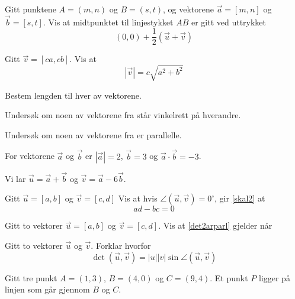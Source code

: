 



	
\opgt
{}
Gitt punktene $ A=(m, n) $ og $ B=(s, t) $, og vektorene $ \vec{a}=[m, n] $ og $ \vec{b}=[s, t] $. Vis at midtpunktet til linjestykket $ AB $ er gitt ved uttrykket
\[ (0, 0) + \frac{1}{2}(\vec{u}+\vec{v}) \]

Gitt $ \vec{v}=[ca, cb] $. Vis at 
\[ |\vec{v}|=c\sqrt{a^2+b^2} \]

 \vs
{}

Bestem lengden til hver av vektorene.

Undersøk om noen av vektorene fra  står vinkelrett på hverandre.

Undersøk om noen av vektorene fra  er parallelle.


For vektorene $ \vec{a} $ og $ \vec{b} $ er $ |\vec{a}|=2 $, $ \vec{b}=3 $ og $ \vec{a}\cdot\vec{b}=-3 $.\os

Vi lar $ \vec{u}=\vec{a}+\vec{b} $ og $ \vec{v}=\vec{a}-6\vec{b} $.

Gitt $ \vec{u}=[a,b] $ og $ \vec{v}=[c, d] $
Vis at hvis $\angle(\vec{u}, \vec{v})=0^\circ $, gir \eqref{skal2} at
\[ ad-bc=0 \]

Gitt to vektorer $ \vec{u}=[a, b] $ og $ \vec{v}=[c, d] $.
Vis at \eqref{det2arparl} gjelder når

Gitt to vektorer $ \vec{u} $ og $ \vec{v} $. Forklar hvorfor
\[ \det(\vec{u}, \vec{v})=|u||v|\sin\angle(\vec{u}, \vec{v}) \]

\newpage
{}
Gitt tre punkt $ A=(1, 3) $, $ B=(4, 0) $ og $ C=(9, 4) $.
Et punkt $ P $ ligger på linjen som går gjennom $ B $ og $ C $.

